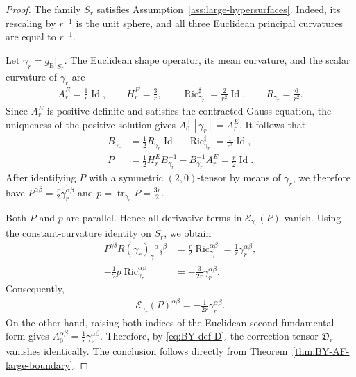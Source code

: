 \documentclass[10pt]{amsart}
\newcommand{\gE}{g_{\mathrm{E}}}
\newcommand{\tr}{\operatorname{tr}}
\newcommand{\Ric}{\operatorname{Ric}}
\newcommand{\Id}{\operatorname{Id}}
\theoremstyle{plain}
\theoremstyle{remark}
\begin{document}
	\begin{proof}
		The family ${S_r}$ satisfies
		Assumption~\ref{ass:large-hypersurfaces}. Indeed, its rescaling by
		$r^{-1}$ is the unit sphere, and all three Euclidean principal
		curvatures are equal to $r^{-1}$.
		
		Let $\gamma_r=\gE|_{S_r}$. The Euclidean shape operator, its mean
		curvature, and the scalar curvature of $\gamma_r$ are
		\begin{align*}
			A_r^E
			=
			\frac{1}{r}\Id,
			\qquad
			H_r^E
			=
			\frac{3}{r},
			\qquad
			\Ric_{\gamma_r}^{\sharp}
			=
			\frac{2}{r^2}\Id,
			\qquad
			R_{\gamma_r}
			=
			\frac{6}{r^2}.
		\end{align*}
		Since $A_r^E$ is positive definite and satisfies the contracted
		Gauss equation, the uniqueness of the positive solution gives
		$A_0^+[\gamma_r]=A_r^E$. It follows that
		\begin{align*}
			B_{\gamma_r}
			&=
			\frac12R_{\gamma_r}\Id
			-
			\Ric_{\gamma_r}^{\sharp}
			=
			\frac{1}{r^2}\Id,
			\\
			P
			&=
			\frac12H_r^E B_{\gamma_r}^{-1}
			-
			B_{\gamma_r}^{-1}A_r^E
			=
			\frac r2\Id.
		\end{align*}
		After identifying $P$ with a symmetric $(2,0)$-tensor by means of
		$\gamma_r$, we therefore have
		$P^{\alpha\beta}=\frac r2\gamma_r^{\alpha\beta}$ and
		$p=\tr_{\gamma_r}P=\frac{3r}{2}$.
		
		Both $P$ and $p$ are parallel. Hence all derivative terms in
		$\mathcal E_{\gamma_r}(P)$ vanish. Using the constant-curvature identity on
		$S_r$, we obtain
		\begin{align*}
			P^{\gamma\delta}
			R(\gamma_r)_{\gamma}{}^{\alpha}{}_{\delta}{}^{\beta}
			&=
			\frac r2\Ric_{\gamma_r}^{\alpha\beta}
			=
			\frac1r\gamma_r^{\alpha\beta},
			\\
			-\frac12p\Ric_{\gamma_r}^{\alpha\beta}
			&=
			-\frac{3}{2r}\gamma_r^{\alpha\beta}.
		\end{align*}
		Consequently,
		\begin{align*}
			\mathcal E_{\gamma_r}(P)^{\alpha\beta}
			=
			-\frac{1}{2r}\gamma_r^{\alpha\beta}.
		\end{align*}
		On the other hand, raising both indices of the Euclidean second
		fundamental form gives
		$A_0^{\alpha\beta}=\frac1r\gamma_r^{\alpha\beta}$. Therefore,
		by \eqref{eq:BY-def-D}, the correction tensor $\mathfrak D_r$ vanishes identically. The conclusion follows directly from
		Theorem~\ref{thm:BY-AF-large-boundary}.
	\end{proof}
	
\end{document}
